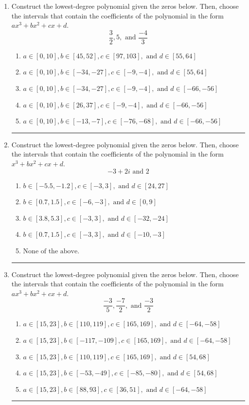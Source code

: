 \documentclass[14pt]{extbook}
\newcommand{\litem}[1]{\item#1\hspace*{-1cm}\rule{\textwidth}{0.4pt}}
\begin{document}
\begin{enumerate}
{\begin{enumerate}[label=\Alph*.]
\end{enumerate} }
\litem{
Construct the lowest-degree polynomial given the zeros below. Then, choose the intervals that contain the coefficients of the polynomial in the form $ax^3+bx^2+cx+d$.\[ \frac{3}{2}, 5, \text{ and } \frac{-4}{3} \]\begin{enumerate}[label=\Alph*.]
\item \( a \in [0, 10], b \in [45, 52], c \in [97, 103], \text{ and } d \in [55, 64] \)
\item \( a \in [0, 10], b \in [-34, -27], c \in [-9, -4], \text{ and } d \in [55, 64] \)
\item \( a \in [0, 10], b \in [-34, -27], c \in [-9, -4], \text{ and } d \in [-66, -56] \)
\item \( a \in [0, 10], b \in [26, 37], c \in [-9, -4], \text{ and } d \in [-66, -56] \)
\item \( a \in [0, 10], b \in [-13, -7], c \in [-76, -68], \text{ and } d \in [-66, -56] \)

\end{enumerate} }
\litem{
Construct the lowest-degree polynomial given the zeros below. Then, choose the intervals that contain the coefficients of the polynomial in the form $x^3+bx^2+cx+d$.\[ -3 + 2 i \text{ and } 2 \]\begin{enumerate}[label=\Alph*.]
\item \( b \in [-5.5, -1.2], c \in [-3, 3], \text{ and } d \in [24, 27] \)
\item \( b \in [0.7, 1.5], c \in [-6, -3], \text{ and } d \in [0, 9] \)
\item \( b \in [3.8, 5.3], c \in [-3, 3], \text{ and } d \in [-32, -24] \)
\item \( b \in [0.7, 1.5], c \in [-3, 3], \text{ and } d \in [-10, -3] \)
\item \( \text{None of the above.} \)

\end{enumerate} }
\litem{
Construct the lowest-degree polynomial given the zeros below. Then, choose the intervals that contain the coefficients of the polynomial in the form $ax^3+bx^2+cx+d$.\[ \frac{-3}{5}, \frac{-7}{2}, \text{ and } \frac{-3}{2} \]\begin{enumerate}[label=\Alph*.]
\item \( a \in [15, 23], b \in [110, 119], c \in [165, 169], \text{ and } d \in [-64, -58] \)
\item \( a \in [15, 23], b \in [-117, -109], c \in [165, 169], \text{ and } d \in [-64, -58] \)
\item \( a \in [15, 23], b \in [110, 119], c \in [165, 169], \text{ and } d \in [54, 68] \)
\item \( a \in [15, 23], b \in [-53, -49], c \in [-85, -80], \text{ and } d \in [54, 68] \)
\item \( a \in [15, 23], b \in [88, 93], c \in [36, 51], \text{ and } d \in [-64, -58] \)


\end{enumerate}}
\end{enumerate}
\end{document}
